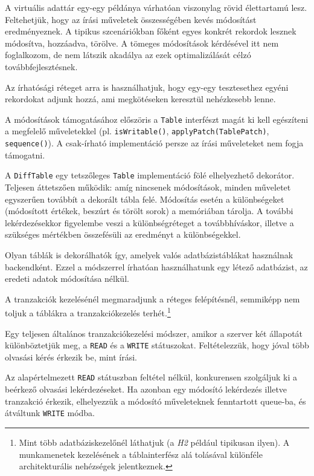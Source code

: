\documentclass[
    parspace,
    noindent,
    nohyp,
]{elteiktdk}[2023/04/10]
\begin{document}
A virtuális adattár egy-egy példánya várhatóan viszonylag rövid élettartamú lesz.
Feltehetjük, hogy az írási műveletek összességében kevés módosítást eredményeznek.
A tipikus szcenáriókban főként egyes konkrét rekordok lesznek módosítva, hozzáadva, törölve.
A tömeges módosítások kérdésével itt nem foglalkozom,
de nem látszik akadálya az ezek optimalizálását célzó továbbfejlesztésnek.

Az írhatósági réteget arra is használhatjuk,
hogy egy-egy tesztesethez egyéni rekordokat adjunk hozzá,
ami megkötéseken keresztül nehézkesebb lenne.

A módosítások támogatásához előszöris a \texttt{Table} interfészt magát
ki kell egészíteni a megfelelő műveletekkel
(pl. \texttt{isWritable()}, \texttt{applyPatch(TablePatch)}, \texttt{sequence()}).
A csak-írható implementáció persze az írási műveleteket nem fogja támogatni.

A \texttt{DiffTable} egy tetszőleges \texttt{Table} implementáció fölé elhelyezhető dekorátor.
Teljesen áttetszően működik: amíg nincsenek módosítások,
minden műveletet egyszerűen továbbít a dekorált tábla felé.
Módosítás esetén a különbségeket (módosított értékek, beszúrt és törölt sorok) a memóriában tárolja.
A további lekérdezésekkor figyelembe veszi a különbségréteget a továbbhíváskor,
illetve a szükséges mértékben összefésüli az eredményt a különbségekkel.

Olyan táblák is dekorálhatók így, amelyek valós adatbázistáblákat használnak backendként.
Ezzel a módszerrel írhatóan használhatunk egy létező adatbázist,
az eredeti adatok módosítása nélkül.

A tranzakciók kezelésénél megmaradjunk a réteges felépítésnél,
semmiképp nem toljuk a táblákra a tranzakciókezelés terhét.\footnote{
    Mint több adatbáziskezelőnél láthatjuk (a \textit{H2} például tipikusan ilyen).
    A munkamenetek kezelésének a táblainterfész alá tolásával
    különféle architekturális nehézségek jelentkeznek.
}

Egy teljesen általános tranzakciókezelési módszer,
amikor a szerver két állapotát különböztetjük meg,
a \texttt{READ} és a \texttt{WRITE} státuszokat.
Feltételezzük, hogy jóval több olvasási kérés érkezik be, mint írási.

Az alapértelmezett \texttt{READ} státuszban feltétel nélkül,
konkurensen szolgáljuk ki a beérkező olvasási lekérdezéseket.
Ha azonban egy módosító lekérdezés illetve tranzakció érkezik,
elhelyezzük a módosító műveleteknek fenntartott queue-ba,
és átváltunk \texttt{WRITE} módba.
\end{document}

